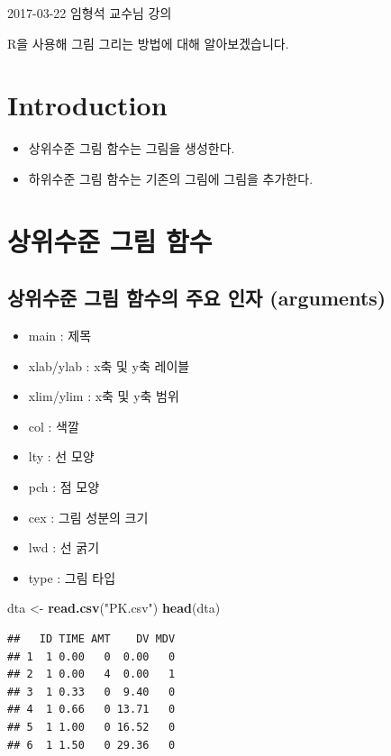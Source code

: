 \documentclass[11pt,]{krantz}
\makeatletter
\newenvironment{Shaded}{\begin{snugshade}}{\end{snugshade}}
\newcommand{\KeywordTok}[1]{\textcolor[rgb]{0.13,0.29,0.53}{\textbf{#1}}}
\newcommand{\StringTok}[1]{\textcolor[rgb]{0.31,0.60,0.02}{#1}}
\newcommand{\NormalTok}[1]{#1}
\providecommand{\tightlist}{%
  \setlength{\itemsep}{0pt}\setlength{\parskip}{0pt}}
\renewenvironment{quote}{\begin{VF}}{\end{VF}}
\newenvironment{kframe}{%
\medskip{}
\setlength{\fboxsep}{.8em}
 \def\at@end@of@kframe{}%
 \ifinner\ifhmode%
  \def\at@end@of@kframe{\end{minipage}}%
  \begin{minipage}{\columnwidth}%
 \fi\fi%
 \def\FrameCommand##1{\hskip\@totalleftmargin \hskip-\fboxsep
 \colorbox{shadecolor}{##1}\hskip-\fboxsep
     \hskip-\linewidth \hskip-\@totalleftmargin \hskip\columnwidth}%
 \MakeFramed {\advance\hsize-\width
   \@totalleftmargin\z@ \linewidth\hsize
   \@setminipage}}%
 {\par\unskip\endMakeFramed%
 \at@end@of@kframe}
\renewenvironment{Shaded}{\begin{kframe}}{\end{kframe}}
\theoremstyle{definition}
\theoremstyle{definition}
\theoremstyle{remark}
\makeatother
\begin{document}
\begin{quote}
2017-03-22 임형석 교수님 강의
\end{quote}

R을 사용해 그림 그리는 방법에 대해 알아보겠습니다.

\section{Introduction}\label{introduction}

\begin{itemize}
\tightlist
\item
  상위수준 그림 함수는 그림을 생성한다.
\item
  하위수준 그림 함수는 기존의 그림에 그림을 추가한다.
\end{itemize}

\section{상위수준 그림 함수}\label{upper}

\subsection{상위수준 그림 함수의 주요 인자
(arguments)}\label{-----arguments}

\begin{itemize}
\tightlist
\item
  main : 제목
\item
  xlab/ylab : x축 및 y축 레이블
\item
  xlim/ylim : x축 및 y축 범위
\item
  col : 색깔
\item
  lty : 선 모양
\item
  pch : 점 모양
\item
  cex : 그림 성분의 크기
\item
  lwd : 선 굵기
\item
  type : 그림 타입
\end{itemize}

\begin{Shaded}
\begin{Highlighting}[]
\NormalTok{dta <-}\StringTok{ }\KeywordTok{read.csv}\NormalTok{(}\StringTok{"PK.csv"}\NormalTok{)}
\KeywordTok{head}\NormalTok{(dta)}
\end{Highlighting}
\end{Shaded}

\begin{verbatim}
##   ID TIME AMT    DV MDV
## 1  1 0.00   0  0.00   0
## 2  1 0.00   4  0.00   1
## 3  1 0.33   0  9.40   0
## 4  1 0.66   0 13.71   0
## 5  1 1.00   0 16.52   0
## 6  1 1.50   0 29.36   0
\end{verbatim}
\end{document}
